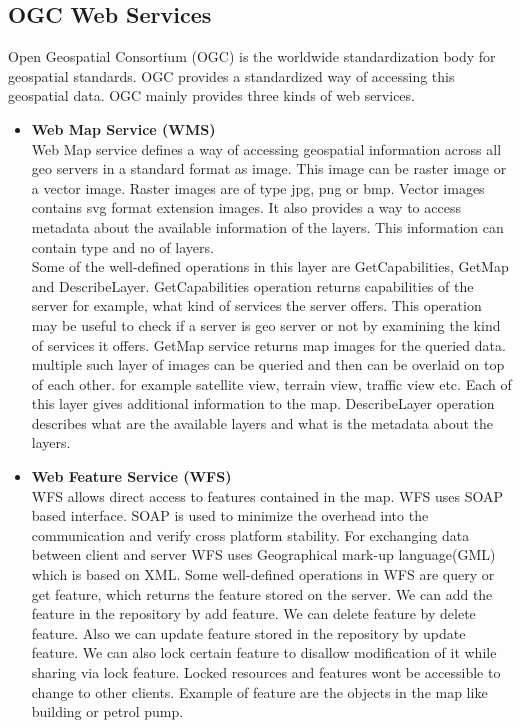 \subsection{OGC Web Services}
Open Geospatial Consortium (OGC) is the worldwide standardization body for geospatial standards. OGC provides a standardized way of accessing this geospatial data. OGC mainly provides three kinds of web services.\\
\begin{itemize}
\item \textbf{Web Map Service (WMS)}\\
Web Map service defines a way of accessing geospatial information across all geo servers in a
standard format as image. This image can be raster image or a vector image. Raster images are
of type jpg, png or bmp. Vector images contains svg format extension images. It also provides
a way to access metadata about the available information of the layers. This information can
contain type and no of layers. \\
Some of the well-defined operations in this layer are
GetCapabilities, GetMap and DescribeLayer. GetCapabilities operation returns capabilities of the server for example, what kind of services the server offers. This operation may be useful to check if a server is geo server or not by examining the kind of services it offers. GetMap service returns map images for the queried data. multiple such layer of images can be queried and then can be overlaid on top of each other. for example satellite view, terrain view, traffic view etc. Each of this layer gives additional information to the map. DescribeLayer operation describes what are the available layers and what is the metadata about the layers.\\
\item \textbf{Web Feature Service (WFS)}\\
WFS allows direct access to features contained in the map. WFS uses SOAP based interface. SOAP is used to minimize the overhead into the communication and verify cross platform stability.
For exchanging data between client and server WFS uses Geographical mark-up language(GML)
which is based on XML. Some well-defined operations in WFS are query or get feature, which
returns the feature stored on the server. We can add the feature in the repository by add feature.
We can delete feature by delete feature. Also we can update feature stored in the repository by
update feature. We can also lock certain feature to disallow modification of it while sharing via lock feature. Locked resources and features wont be accessible to change to other clients. Example of feature are the objects in the map like building or petrol pump.\\

\end{itemize}
